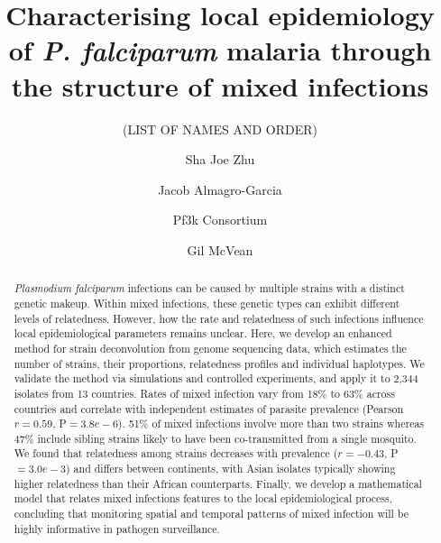\documentclass[9pt,lineno]{elife}
\newcounter{todocounter}
\newcommand{\done}[2][]
{\todo[color=green!40, #1]{#2}}
\newcommand{\donenum}[2][]
{\stepcounter{todocounter}\done[#1]{\thetodocounter: #2}}
\begin{document}
\title{Characterising local epidemiology of {\it P. falciparum} malaria through the structure of mixed infections}
\newcommand\shorttitle{Mixed infections in malaria}
\date{}

\author[?]{(LIST OF NAMES AND ORDER)}
\author[1]{Sha Joe Zhu}
\author[1,2,3,4]{Jacob Almagro-Garcia}
\author[?]{Pf3k Consortium}
\author[1,3]{Gil McVean}



\maketitle{}

\begin{abstract}
{\it Plasmodium falciparum} infections can be caused by multiple strains with a distinct genetic makeup. Within mixed infections, these genetic types can exhibit different levels of relatedness. However, how the rate and relatedness of such infections influence local epidemiological parameters remains unclear.  Here, we develop an enhanced method for strain deconvolution from genome sequencing data, which estimates the number of strains, their proportions, relatedness profiles and individual haplotypes.  We validate the method via simulations and controlled experiments, and apply it to 2,344 isolates from 13 countries.  Rates of mixed infection vary from 18\% to 63\% across countries and correlate with independent estimates of parasite prevalence (Pearson $r = 0.59$, P$=3.8e-6$).  51\% of mixed infections involve more than two strains whereas 47\% include sibling strains likely to have been co-transmitted from a single mosquito. We found that relatedness among strains decreases with prevalence ($r = -0.43$, P$=3.0e-3$) and differs between continents, with Asian isolates typically showing higher relatedness than their African counterparts. Finally, we develop a mathematical model that relates mixed infections features to the local epidemiological process, concluding that monitoring spatial and temporal patterns of mixed infection will be highly informative in pathogen surveillance.
\end{abstract}
\end{document}

